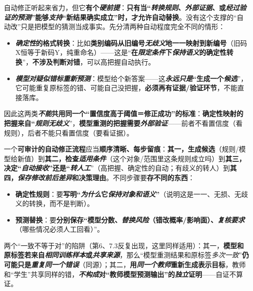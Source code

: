 自动修正听起来省力，但它\textbf{有个\emph{硬前提}}：\textbf{只有当“\emph{转换规则}、\emph{外部证据}、或\emph{经过验证的预测}”能够\emph{支持}“新结果确实成立”时，才允许自动替换}。没有这个支撑的“自动改”只是把模型的猜测当成事实。先分清两种自动程度完全不同的情形：
\begin{itemize}\item \textbf{\emph{确定性}的格式转换}：比如\textbf{类别编码从旧编号\emph{无歧义}地一一映射到新编号}（旧码X恒等于新码Y，纯重命名）——这是“\textbf{在\emph{限定条件}下\emph{保持语义}的确定性转换}”，\textbf{不涉及判断对错}，可以高把握自动执行。\item \textbf{\emph{模型对疑似错标重新预测}}：模型给个新答案——这\textbf{\emph{永远只是}“生成一个\emph{候选}}”，它可能重复原标签的错、可能自己没把握，\textbf{必须再有证据/验证环节}，不能直接落库。\end{itemize}
因此这两类\textbf{\emph{不能}共用同一个“\textbf{置信度高于阈值＝修正成功}”的标准}：\textbf{确定性映射的把握来自“\emph{规则无歧义}}”，\textbf{模型重测的把握需要\emph{外部验证}}——前者不看置信度（看规则），后者不能只看置信度（要看证据）。

一个\textbf{可审计的自动修正流程}应当\textbf{顺序清晰、每步留痕}：\textbf{其一，生成候选}（规则/模型给新值）到\textbf{其二，检查\emph{适用条件}}（这个对象/范围里这条规则成立吗）到\textbf{其三，决定“\emph{自动接收}”还是“\emph{转人工}}”（高把握、确定性的自动；有歧义的转人）到\textbf{其四，\emph{保存修改前后差异}和决策理由}。不同步骤要\textbf{存不同的东西}：
\begin{itemize}\item \textbf{确定性规则}：要\textbf{写明“\emph{为什么}它\emph{保持对象和语义}”}（说明这是一一、无损、无歧义的转换，而不是判断）。\item \textbf{预测替换}：要\textbf{分别保存“模型分数、\emph{替换风险}（错改概率/影响面）、\emph{复核要求}}（哪些情况必须人工回看）”。\end{itemize}
两个“一致不等于对”的陷阱（第6、7.3反复出现，这里同样适用）：其一，\textbf{模型和原标签若来自\emph{相同训练样本}或\emph{共享来源}}，那么“模型重测结果和原标签\emph{多次一致}”\textbf{仍可能只是\emph{重复同一个错误}}（同源）；其二，\textbf{用\emph{同一个教师}重新生成表示目标}，教师和“学生”共享同样的错，\textbf{\emph{不构成}对“教师模型预测输出”的\emph{独立}证明}——自证不算证。

